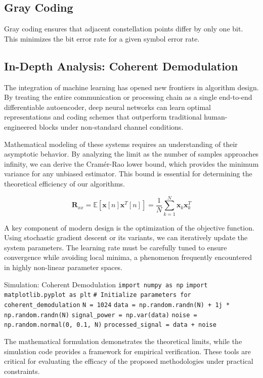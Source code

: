 \subsection{Gray Coding}
Gray coding ensures that adjacent constellation points differ by only one bit. This minimizes the bit error rate for a given symbol error rate.

\subsection{In-Depth Analysis: Coherent Demodulation}
The integration of machine learning has opened new frontiers in algorithm design. By treating the entire communication or processing chain as a single end-to-end differentiable autoencoder, deep neural networks can learn optimal representations and coding schemes that outperform traditional human-engineered blocks under non-standard channel conditions.

Mathematical modeling of these systems requires an understanding of their asymptotic behavior. By analyzing the limit as the number of samples approaches infinity, we can derive the Cramér-Rao lower bound, which provides the minimum variance for any unbiased estimator. This bound is essential for determining the theoretical efficiency of our algorithms.

\begin{equation}
    \mathbf{R}_{xx} = \mathbb{E}[\mathbf{x}[n]\mathbf{x}^T[n]] = \frac{1}{N} \sum_{k=1}^{N} \mathbf{x}_k \mathbf{x}_k^T
\end{equation}

A key component of modern design is the optimization of the objective function. Using stochastic gradient descent or its variants, we can iteratively update the system parameters. The learning rate must be carefully tuned to ensure convergence while avoiding local minima, a phenomenon frequently encountered in highly non-linear parameter spaces.

\begin{pythonbox}{Simulation: Coherent Demodulation}
\texttt{import numpy as np}
\texttt{import matplotlib.pyplot as plt}
\texttt{}
\texttt{\# Initialize parameters for coherent\_demodulation}
\texttt{N = 1024}
\texttt{data = np.random.randn(N) + 1j * np.random.randn(N)}
\texttt{signal\_power = np.var(data)}
\texttt{noise = np.random.normal(0, 0.1, N)}
\texttt{processed\_signal = data + noise}
\end{pythonbox}

\vspace{0.5cm}
The mathematical formulation demonstrates the theoretical limits, while the simulation code provides a framework for empirical verification. These tools are critical for evaluating the efficacy of the proposed methodologies under practical constraints.


